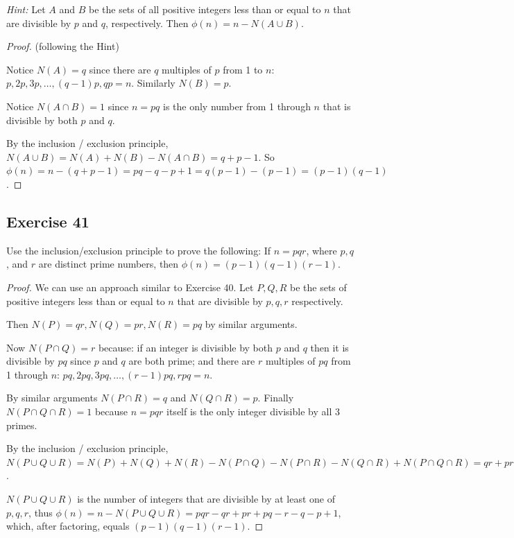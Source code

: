 \documentclass[14pt]{extarticle}
\begin{document}
{\it Hint:} Let $A$ and $B$ be the sets of all positive integers less than or equal to $n$ that are divisible by 
$p$ and $q$, respectively. Then \(\phi(n) = n - N(A \cup B)\).

\begin{proof}
(following the Hint) 

Notice \(N(A) = q\) since there are $q$ multiples of $p$ from 1 to $n$: \(p, 2p, 3p, \ldots, (q-1)p, qp = n\).
Similarly \(N(B) = p\).

Notice \(N(A \cap B) = 1\) since \(n = pq\) is the only number from 1 through $n$ that is divisible by both $p$ and $q$.

By the inclusion / exclusion principle, \(N(A \cup B) = N(A) + N(B) - N(A \cap B) = q + p - 1\). So \(\phi(n) = n - 
(q+p-1) = pq-q-p+1 = q(p-1) - (p-1) = (p-1)(q-1)\).
\end{proof}

\subsection{Exercise 41}
Use the inclusion/exclusion principle to prove the following: If \(n = pqr\), where \(p, q\), and \(r\) are 
distinct prime numbers, then \(\phi(n) = (p - 1)(q - 1)(r - 1)\).

\begin{proof}
We can use an approach similar to Exercise 40. Let \(P, Q, R\) be the sets of positive integers less than or equal to
$n$ that are divisible by \(p,q,r\) respectively. 

Then \(N(P) = qr, N(Q) = pr, N(R) = pq\) by similar arguments. 

Now \(N(P \cap Q) = r\) because: if an integer is divisible by both $p$ and $q$ then it is divisible by $pq$ since $p$ 
and $q$ are both prime; and there are $r$ multiples of $pq$ from 1 through $n$: \(pq, 2pq, 3pq, \ldots, (r-1)pq, rpq = n\).

By similar arguments \(N(P \cap R) = q\) and \(N(Q \cap R) = p\). Finally \(N(P \cap Q \cap R) = 1\) because \(n=pqr\)
itself is the only integer divisible by all 3 primes.

By the inclusion / exclusion principle, \(N(P \cup Q \cup R) = N(P) + N(Q) + N(R) - N(P \cap Q) -N(P \cap R) - N(Q 
\cap R) + N(P \cap Q \cap R) = qr + pr + pq - r - q - p + 1\).

\(N(P \cup Q \cup R)\) is the number of integers that are divisible by at least one of \(p,q,r\), thus \(\phi(n) = 
n - N(P \cup Q \cup R) = pqr - qr + pr + pq - r - q - p + 1\), which, after factoring, equals \((p-1)(q-1)(r-1)\).
\end{proof}
\end{document}

